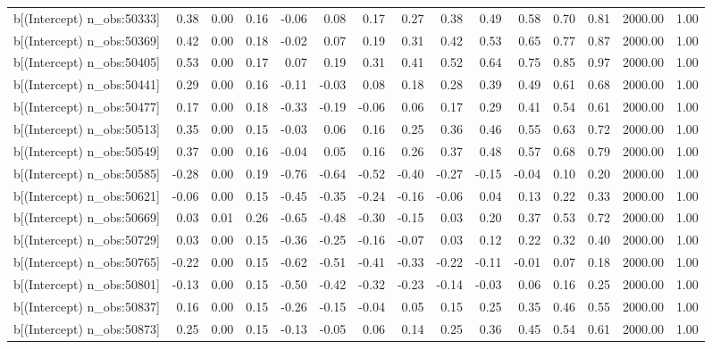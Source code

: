 \begin{table}[ht]
\begin{tabular}{rrrrrrrrrrrrrrr}
  b[(Intercept) n\_obs:50333] & 0.38 & 0.00 & 0.16 & -0.06 & 0.08 & 0.17 & 0.27 & 0.38 & 0.49 & 0.58 & 0.70 & 0.81 & 2000.00 & 1.00 \\ 
  b[(Intercept) n\_obs:50369] & 0.42 & 0.00 & 0.18 & -0.02 & 0.07 & 0.19 & 0.31 & 0.42 & 0.53 & 0.65 & 0.77 & 0.87 & 2000.00 & 1.00 \\ 
  b[(Intercept) n\_obs:50405] & 0.53 & 0.00 & 0.17 & 0.07 & 0.19 & 0.31 & 0.41 & 0.52 & 0.64 & 0.75 & 0.85 & 0.97 & 2000.00 & 1.00 \\ 
  b[(Intercept) n\_obs:50441] & 0.29 & 0.00 & 0.16 & -0.11 & -0.03 & 0.08 & 0.18 & 0.28 & 0.39 & 0.49 & 0.61 & 0.68 & 2000.00 & 1.00 \\ 
  b[(Intercept) n\_obs:50477] & 0.17 & 0.00 & 0.18 & -0.33 & -0.19 & -0.06 & 0.06 & 0.17 & 0.29 & 0.41 & 0.54 & 0.61 & 2000.00 & 1.00 \\ 
  b[(Intercept) n\_obs:50513] & 0.35 & 0.00 & 0.15 & -0.03 & 0.06 & 0.16 & 0.25 & 0.36 & 0.46 & 0.55 & 0.63 & 0.72 & 2000.00 & 1.00 \\ 
  b[(Intercept) n\_obs:50549] & 0.37 & 0.00 & 0.16 & -0.04 & 0.05 & 0.16 & 0.26 & 0.37 & 0.48 & 0.57 & 0.68 & 0.79 & 2000.00 & 1.00 \\ 
  b[(Intercept) n\_obs:50585] & -0.28 & 0.00 & 0.19 & -0.76 & -0.64 & -0.52 & -0.40 & -0.27 & -0.15 & -0.04 & 0.10 & 0.20 & 2000.00 & 1.00 \\ 
  b[(Intercept) n\_obs:50621] & -0.06 & 0.00 & 0.15 & -0.45 & -0.35 & -0.24 & -0.16 & -0.06 & 0.04 & 0.13 & 0.22 & 0.33 & 2000.00 & 1.00 \\ 
  b[(Intercept) n\_obs:50669] & 0.03 & 0.01 & 0.26 & -0.65 & -0.48 & -0.30 & -0.15 & 0.03 & 0.20 & 0.37 & 0.53 & 0.72 & 2000.00 & 1.00 \\ 
  b[(Intercept) n\_obs:50729] & 0.03 & 0.00 & 0.15 & -0.36 & -0.25 & -0.16 & -0.07 & 0.03 & 0.12 & 0.22 & 0.32 & 0.40 & 2000.00 & 1.00 \\ 
  b[(Intercept) n\_obs:50765] & -0.22 & 0.00 & 0.15 & -0.62 & -0.51 & -0.41 & -0.33 & -0.22 & -0.11 & -0.01 & 0.07 & 0.18 & 2000.00 & 1.00 \\ 
  b[(Intercept) n\_obs:50801] & -0.13 & 0.00 & 0.15 & -0.50 & -0.42 & -0.32 & -0.23 & -0.14 & -0.03 & 0.06 & 0.16 & 0.25 & 2000.00 & 1.00 \\ 
  b[(Intercept) n\_obs:50837] & 0.16 & 0.00 & 0.15 & -0.26 & -0.15 & -0.04 & 0.05 & 0.15 & 0.25 & 0.35 & 0.46 & 0.55 & 2000.00 & 1.00 \\ 
  b[(Intercept) n\_obs:50873] & 0.25 & 0.00 & 0.15 & -0.13 & -0.05 & 0.06 & 0.14 & 0.25 & 0.36 & 0.45 & 0.54 & 0.61 & 2000.00 & 1.00 \\ 

\end{tabular}
\end{table}
